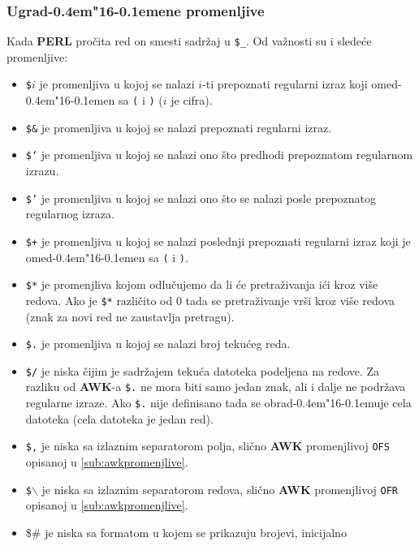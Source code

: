 \documentclass[12pt,a4paper]{article}
\def\d{d\kern-0.4em\char"16\kern-0.1em}
\def\bs{$\backslash$}
\begin{document}
      \subsubsection{Ugra\d ene promenljive}
        Kada {\bf PERL} pro\v cita red on smesti sadr\v zaj u {\tt\$\_}.
        Od va\v znosti su i slede\'ce promenljive:
        \begin{itemize}
        \item
          {\tt\$$i$} je promenljiva u kojoj se nalazi $i$-ti prepoznati
          regularni izraz koji ome\d en sa {\tt(} i {\tt)} ($i$ je cifra).
        \item
          {\tt\$\&} je promenljiva u kojoj se nalazi prepoznati regularni
          izraz.
        \item
          {\tt\$`} je promenljiva u kojoj se nalazi ono \v sto predhodi
          prepoznatom regu\-larnom izrazu.
        \item
          {\tt\$'} je promenljiva u kojoj se nalazi ono \v sto se nalazi posle
          prepoznatog regularnog izraza.
        \item
          {\tt\$+} je promenljiva u kojoj se nalazi poslednji prepoznati
          regularni izraz koji je ome\d en sa {\tt(} i {\tt)}.
        \item
          {\tt\$*} je promenjliva kojom odlu\v cujemo da li \'ce
          pretra\v zivanja i\'ci kroz vi\v se redova.
          Ako je {\tt\$*} razli\v cito od 0 tada se pretra\v zivanje vr\v si
          kroz vi\v se redova (znak za novi red ne zaustavlja pretragu).
        \item
          {\tt\$.} je promenljiva u kojoj se nalazi broj teku\'ceg reda.
        \item
          {\tt\$/} je niska \v cijim je sadr\v zajem teku\'ca datoteka
          podeljena na redove.
          Za razliku od {\bf AWK}-a {\tt\$.} ne mora biti samo jedan znak, ali
          i dalje ne podr\v zava regularne izraze.
          Ako {\tt\$.} nije definisano tada se obra\d uje cela datoteka (cela
          datoteka je jedan red).
        \item
          {\tt\$,} je niska sa izlaznim separatorom polja, sli\v cno {\bf AWK}
          promenjlivoj {\tt OFS} opisanoj u \ref{sub:awkpromenjlive}.
        \item
          {\tt\$\bs} je niska sa izlaznim separatorom redova, sli\v cno
          {\bf AWK} promenjlivoj {\tt OFR} opisanoj u
          \ref{sub:awkpromenjlive}.
        \item
          {\$\#} je niska sa formatom u kojem se prikazuju brojevi, inicijalno

\end{itemize}
\end{document}
